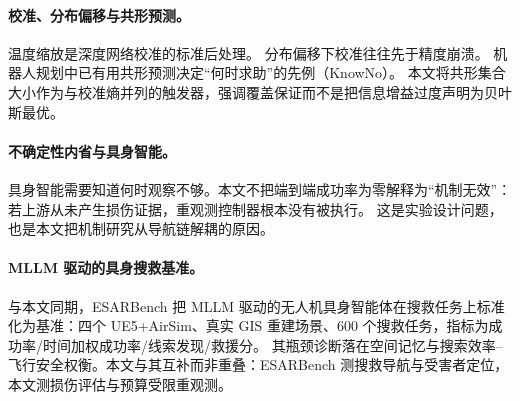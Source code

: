 \paragraph{校准、分布偏移与共形预测。}
温度缩放是深度网络校准的标准后处理\cite{guo2017calibration}。
分布偏移下校准往往先于精度崩溃\cite{ovadia2019can}。
机器人规划中已有用共形预测决定``何时求助''的先例（KnowNo）\cite{ren2023knowno}。
本文将共形集合大小作为与校准熵并列的触发器，强调覆盖保证而不是把信息增益过度声明为贝叶斯最优。

\paragraph{不确定性内省与具身智能。}
具身智能需要知道何时观察不够。本文不把端到端成功率为零解释为``机制无效''：若上游从未产生损伤证据，重观测控制器根本没有被执行。
这是实验设计问题，也是本文把机制研究从导航链解耦的原因。

\paragraph{MLLM 驱动的具身搜救基准。}
与本文同期，ESARBench 把 MLLM 驱动的无人机具身智能体在搜救任务上标准化为基准：四个 UE5+AirSim、真实 GIS 重建场景、600 个搜救任务，指标为成功率/时间加权成功率/线索发现/救援分\cite{zhang2026esarbench}。
其瓶颈诊断落在空间记忆与搜索效率--飞行安全权衡。本文与其互补而非重叠：ESARBench 测搜救导航与受害者定位，本文测损伤评估与预算受限重观测。
